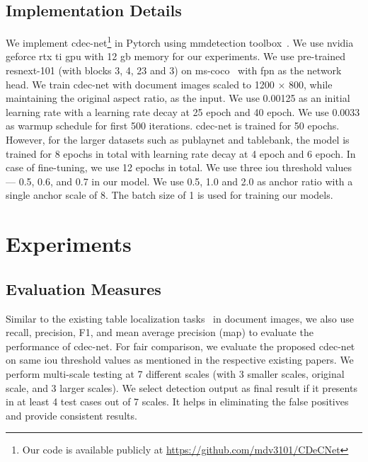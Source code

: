 \documentclass[a4paper,conference]{IEEEtran}
\begin{document}
\subsection{Implementation Details}

We implement {\sc cd}e{\sc c-n}et\footnote[2]{Our code is available publicly at \url{https://github.com/mdv3101/CDeCNet}} in Pytorch using {\sc mm}detection toolbox~\cite{mmdetection}. We use {\sc nvidia} {\sc g}e{\sc f}orce {\sc rtx} { t}i {\sc gpu} with 12 {\sc gb} memory for our experiments. We use pre-trained {\sc r}es{\sc n}e{\sc x}t-101 (with blocks 3, 4, 23 and 3) on {\sc ms-coco}~\cite{lin2014microsoft} with {\sc fpn} as the network head. We train {\sc cd}e{\sc c-n}et with document images scaled to 1200 $\times$ 800, while maintaining the original aspect ratio, as the input. We use 0.00125 as an initial learning rate with a learning rate decay at 25 epoch and 40 epoch. We use 0.0033 as warmup schedule for first 500 iterations. {\sc cd}e{\sc c-n}et is trained for 50 epochs. However, for the larger datasets such as {\sc p}ub{\sc l}ay{\sc n}et and {\sc t}able{\sc b}ank, the model is trained for 8 epochs in total with learning rate decay at 4 epoch and 6 epoch. In case of fine-tuning, we use 12 epochs in total. We use three {\sc i}o{\sc u} threshold values --- 0.5, 0.6, and 0.7 in our model. We use 0.5, 1.0 and 2.0 as anchor ratio with a single anchor scale of 8. The batch size of 1 is used for training our models.    

\section{Experiments}

\subsection{Evaluation Measures}

Similar to the existing table localization tasks~\cite{gilani2017table,schreiber2017deepdesrt,siddiqui2018decnt,vo2018ensemble,arif2018table,li2019tablebank,sun2019faster,younas2019ffd,zhong2019publaynet,saha2019graphical,casado2019benefits} in document images, we also use recall, precision, F1, and mean average precision (m{\sc ap}) to evaluate the performance of {\sc cd}e{\sc c-n}et. For fair comparison, we evaluate the proposed {\sc cd}e{\sc c-n}et on same {\sc i}o{\sc u} threshold values as mentioned in the respective existing papers. We perform multi-scale testing at 7 different scales (with 3 smaller scales, original scale, and 3 larger scales). We select detection output as final result if it presents in at least 4 test cases out of 7 scales. It helps in eliminating the false positives and provide consistent results.
\end{document}
